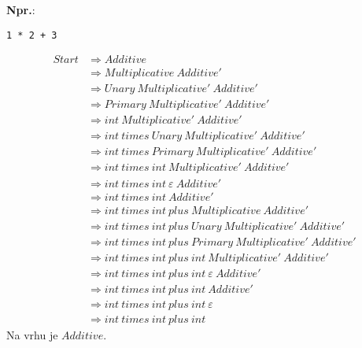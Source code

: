 \documentclass{report}
\newcommand{\Ex}{\textbf{Npr.}:\ }
\newcommand{\Null}{\varepsilon}
\newcommand{\Spc}{\ }
\newcommand{\Derive}{\Rightarrow}
\newcommand{\NT}[1]{{#1}}
\newcommand{\T}[1]{{#1}}
\begin{document}
\Ex
\begin{lstlisting}
1 * 2 + 3
\end{lstlisting}
\begin{equation*}
  \begin{aligned}
    \NT{Start} &\Derive \NT{Additive}\\
    &\Derive \NT{Multiplicative} \Spc \NT{Additive'}\\
    &\Derive \NT{Unary} \Spc \NT{Multiplicative'} \Spc \NT{Additive'}\\
    &\Derive \NT{Primary} \Spc \NT{Multiplicative'} \Spc \NT{Additive'}\\
    &\Derive \T{int} \Spc \NT{Multiplicative'} \Spc \NT{Additive'}\\
    &\Derive \T{int} \Spc \T{times} \Spc \NT{Unary} \Spc \NT{Multiplicative'} \Spc \NT{Additive'}\\
    &\Derive \T{int} \Spc \T{times} \Spc \NT{Primary} \Spc \NT{Multiplicative'} \Spc \NT{Additive'}\\
    &\Derive \T{int} \Spc \T{times} \Spc \T{int} \Spc \NT{Multiplicative'} \Spc \NT{Additive'}\\
    &\Derive \T{int} \Spc \T{times} \Spc \T{int} \Spc \Null \Spc \NT{Additive'}\\
    &\Derive \T{int} \Spc \T{times} \Spc \T{int} \Spc \NT{Additive'}\\
    &\Derive \T{int} \Spc \T{times} \Spc \T{int} \Spc \T{plus} \Spc \NT{Multiplicative} \Spc \NT{Additive'}\\
    &\Derive \T{int} \Spc \T{times} \Spc \T{int} \Spc \T{plus} \Spc \NT{Unary} \Spc \NT{Multiplicative'} \Spc \NT{Additive'}\\
    &\Derive \T{int} \Spc \T{times} \Spc \T{int} \Spc \T{plus} \Spc \NT{Primary} \Spc \NT{Multiplicative'} \Spc \NT{Additive'}\\
    &\Derive \T{int} \Spc \T{times} \Spc \T{int} \Spc \T{plus} \Spc \T{int} \Spc \NT{Multiplicative'} \Spc \NT{Additive'}\\
    &\Derive \T{int} \Spc \T{times} \Spc \T{int} \Spc \T{plus} \Spc \T{int} \Spc \Null \Spc \NT{Additive'}\\
    &\Derive \T{int} \Spc \T{times} \Spc \T{int} \Spc \T{plus} \Spc \T{int} \Spc \NT{Additive'}\\
    &\Derive \T{int} \Spc \T{times} \Spc \T{int} \Spc \T{plus} \Spc \T{int} \Spc \Null\\
    &\Derive \T{int} \Spc \T{times} \Spc \T{int} \Spc \T{plus} \Spc \T{int}
  \end{aligned}
\end{equation*}
Na vrhu je $\NT{Additive}$.
\end{document}
